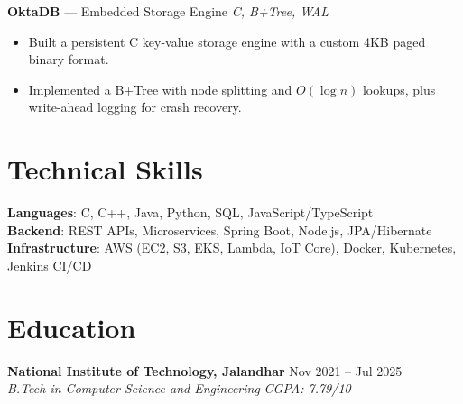 \documentclass[a4paper,9pt]{article}
\newcommand{\role}[4]{%
  \textbf{#1} \hfill #2 \\
  \textit{#3} \hfill \textit{#4}\par\vspace{2pt}}
\begin{document}
\textbf{OktaDB} --- Embedded Storage Engine \hfill \textit{C, B+Tree, WAL}
\begin{itemize}
  \item Built a persistent C key-value storage engine with a custom 4KB paged binary format.
  \item Implemented a B+Tree with node splitting and $O(\log n)$ lookups, plus write-ahead logging for crash recovery.
\end{itemize}

\section{Technical Skills}
\textbf{Languages}: C, C++, Java, Python, SQL, JavaScript/TypeScript \\
\textbf{Backend}: REST APIs, Microservices, Spring Boot, Node.js, JPA/Hibernate \\
\textbf{Infrastructure}: AWS (EC2, S3, EKS, Lambda, IoT Core), Docker, Kubernetes, Jenkins CI/CD

\section{Education}
\role{National Institute of Technology, Jalandhar}{Nov 2021 -- Jul 2025}{B.Tech in Computer Science and Engineering}{CGPA: 7.79/10}
\end{document}
